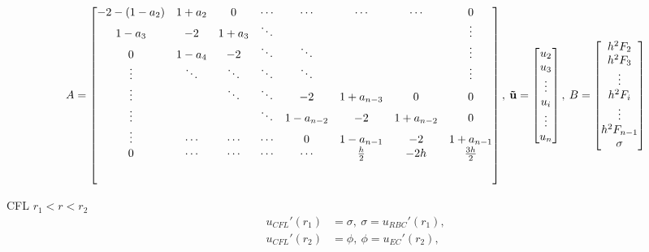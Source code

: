 \documentclass[8pt, a4paper]{article}
\begin{document}
  \setlength{\extrarowheight}{1.25\baselineskip}
  \begin{equation}
  A=
  \begin{bmatrix}
  -2-(1-a_2) & 1+a_2 & 0 & \cdots & \cdots & \cdots & \cdots & 0\\
  1-a_3 & -2 & 1+a_3 & \ddots & & & & \vdots\\
  0 & 1-a_4 & -2 & \ddots & \ddots & &  & \vdots\\
  \vdots & \ddots & \ddots & \ddots & \ddots & & & \vdots\\
  \vdots & & \ddots & \ddots & -2 & 1+a_{n-3} & 0 & 0 \\
  \vdots & & & \ddots & 1-a_{n-2} & -2 & 1+a_{n-2} & 0\\
  \vdots & \cdots & \cdots & \cdots & 0 & 1-a_{n-1} & -2 & 1+a_{n-1}\\
  0 & \cdots & \cdots & \cdots & \cdots & \frac{h}{2} & -2h & 
  \frac{3h}{2}\\[5ex]
  \end{bmatrix},\:
  \mathbf{\vec{u}}=
  \begin{bmatrix}
  u_2\\
  u_3\\
  \vdots\\
  u_i\\
  \vdots\\
  u_n
  \end{bmatrix},\:
  B=
  \begin{bmatrix}
  h^2F_2\\
  h^2F_3\\
  \vdots\\
  h^2F_i\\
  \vdots\\
  h^2F_{n-1}\\
  \sigma
  \end{bmatrix}
  \end{equation}

  CFL $r_1<r<r_2$
  \begin{align*}
  u_{CFL}'(r_1)&=\sigma,\:\sigma=u_{RBC}'(r_1),\\
  u_{CFL}'(r_2)&=\phi,\:\phi=u_{EC}'(r_2),\\
  \end{align*}
  
\end{document}
